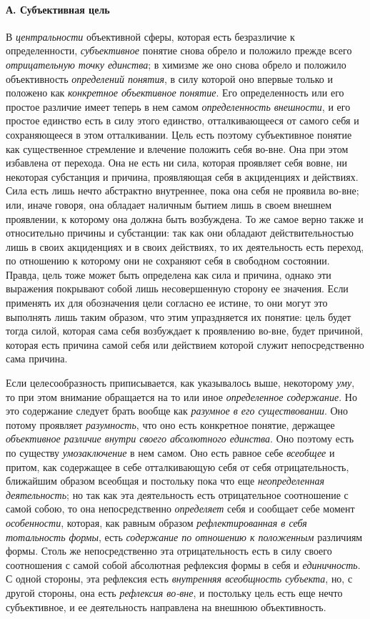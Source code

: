 \documentclass[twoside]{article}
\begin{document}
{{{{\paragraph[А. Субъективная цель]{А. Субъективная цель}
В {\em центральности}
объективной сферы, которая есть безразличие к определенности,
{\em субъективное}
понятие снова обрело и положило прежде всего
{\em отрицательную точку единства};
в химизме же оно снова обрело и положило объективность
{\em определений понятия},
в силу которой оно впервые только и положено как
{\em конкретное объективное понятие}.
Его определенность или его простое различие имеет теперь в
нем самом {\em определенность
внешности}, и его простое единство есть в силу этого
единство, отталкивающееся от самого себя и сохраняющееся в этом
отталкивании. Цель есть поэтому субъективное понятие как существенное
стремление и влечение положить себя во-вне. Она при этом избавлена от
перехода. Она не есть ни сила, которая проявляет себя вовне, ни некоторая
субстанция и причина, проявляющая себя в акциденциях и действиях. Сила есть
лишь нечто абстрактно внутреннее, пока она себя не проявила во-вне; или,
иначе говоря, она обладает наличным бытием лишь в своем внешнем проявлении,
к которому она должна быть возбуждена. То же самое верно также и
относительно причины и субстанции: так как они обладают действительностью
лишь в своих акциденциях и в своих действиях, то их деятельность есть
переход, по отношению к которому они не сохраняют себя в свободном
состоянии. Правда, цель тоже может быть определена как сила и причина,
однако эти выражения покрывают собой лишь несовершенную сторону ее
значения. Если применять их для обозначения цели согласно ее истине, то они
могут это выполнять лишь таким образом, что этим упраздняется их понятие:
цель будет тогда силой, которая сама себя возбуждает к проявлению во-вне,
будет причиной, которая есть причина самой себя или действием которой
служит непосредственно сама причина.

Если целесообразность приписывается, как указывалось выше,
некоторому {\em уму}, то
при этом внимание обращается на то или иное
{\em определенное содержание}.
Но это содержание следует брать вообще как
{\em разумное в его существовании}.
Оно потому проявляет
{\em разумность}, что оно
есть конкретное понятие, держащее
{\em объективное различие внутри своего
абсолютного единства}. Оно поэтому есть по существу
{\em умозаключение} в нем
самом. Оно есть равное себе
{\em всеобщее} и притом,
как содержащее в себе отталкивающую себя от себя
отрицательность, ближайшим образом всеобщая и постольку пока
что еще {\em неопределенная
деятельность}; но так как эта деятельность есть
отрицательное соотношение с самой собою, то она непосредственно
{\em определяет} себя и
сообщает себе момент {\em особенности},
которая, как равным образом
{\em рефлектированная в себя тотальность
формы}, есть
{\em содержание по отношению к
положенным} различиям формы. Столь же непосредственно эта
отрицательность есть в силу своего соотношения с самой собой абсолютная
рефлексия формы в себя и
{\em единичность}. С
одной стороны, эта рефлексия есть
{\em внутренняя всеобщность субъекта},
но, с другой стороны, она есть
{\em рефлексия во-вне}, и
постольку цель есть еще нечто субъективное, и ее деятельность направлена на
внешнюю объективность.

}}}}
\end{document}

